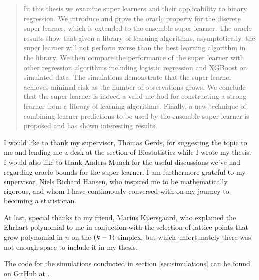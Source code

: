 \vspace{\fill}
\begin{abstract}
In this thesis we examine super learners and their applicability to binary regression. We introduce and prove the oracle property for the discrete super learner, which is extended to the ensemble super learner. The oracle results show that given a library of learning algorithms, asymptotically, the super learner will not perform worse than the best learning algorithm in the library. We then compare the performance of the super learner with other regression algorithms including logistic regression and XGBoost on simulated data. The simulations demonstrate that the super learner achieves minimal risk as the number of observations grows. We conclude that the super learner is indeed a valid method for constructing a strong learner from a library of learning algorithms. Finally, a new technique of combining learner predictions to be used by the ensemble super learner is proposed and has shown interesting results. 
\end{abstract}
\vspace{\fill}
\begin{acknowledgements}
   I would like to thank my supervisor, Thomas Gerds, for suggesting the topic to me and lending me a desk at the section of Biostatistics while I wrote my thesis. I would also like to thank Anders Munch for the useful discussions we've had regarding oracle bounds for the super learner. I am furthermore grateful to my supervisor, Niels Richard Hansen, who inspired me to be mathematically rigorous, and whom I have continuously conversed with on my journey to becoming a statistician.

   At last, special thanks to my friend, Marius Kjærsgaard, who explained the Ehrhart polynomial to me in conjuction with the selection of lattice points that grow polynomial in $ n $ on the $ (k-1) $-simplex, but which unfortunately there was not enough space to include it in my thesis. 
\end{acknowledgements}
\vspace{\fill}
\begin{codeavailability}
    The code for the simulations conducted in section \ref{sec:simulations} can be found on GitHub at \parencite{github}.
\end{codeavailability}
\vspace{\fill}

